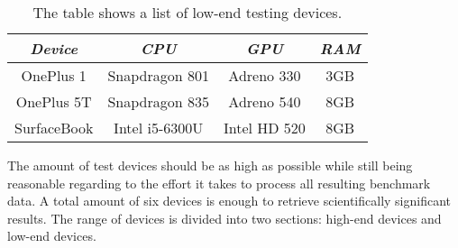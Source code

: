\begin{table}
  \centering
  \begin{threeparttable}
    \caption{The table shows a list of low-end testing devices.}
    \label{tab:lowendTestingDevices}
    \centering
    \def\rr{\rightskip=0pt plus1em \spaceskip=.3333em \xspaceskip=.5em\relax}
    \setlength{\tabcolsep}{1ex}
    \def\arraystretch{1.20}
    \setlength{\tabcolsep}{1ex}
    \small
    \begin{english}
      \begin{tabular}{|c||c|c|c|}
        \hline
          \multicolumn{1}{|c||}{\emph{Device}}&
          \multicolumn{1}{|c}{\emph{CPU}} &
          \multicolumn{1}{|c}{\emph{GPU}} &
          \multicolumn{1}{|c|}{\emph{RAM}} \\
        \hline
        \hline
        OnePlus 1 & 
        Snapdragon 801 & 
        Adreno 330 & 
        3GB \\
        \hline
        OnePlus 5T & 
        Snapdragon 835 & 
        Adreno 540  & 
        8GB \\
        \hline
        SurfaceBook & 
        Intel i5-6300U & 
        Intel HD 520 & 
        8GB \\
        \hline
      \end{tabular}  
    \end{english}
  \end{threeparttable}
\end{table}

The amount of test devices should be as high as possible while still being reasonable regarding to the effort it takes to process all resulting benchmark data. A total amount of six devices is enough to retrieve scientifically significant results. The range of devices is divided into two sections: high-end devices and low-end devices. 

